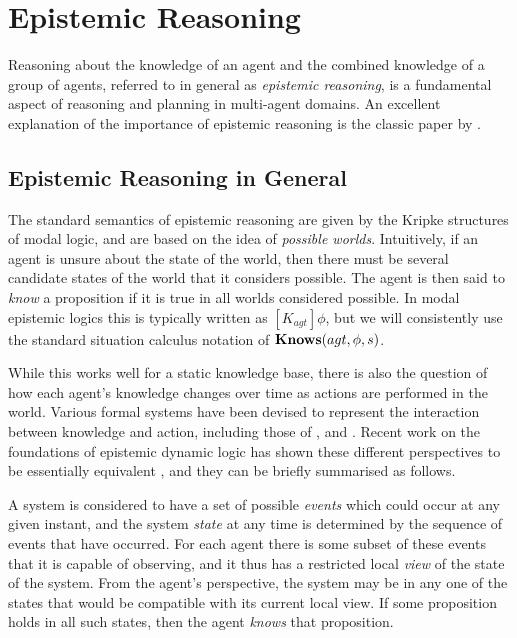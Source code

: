\section{Epistemic Reasoning\label{sec:Background:Epistemic}}

Reasoning about the knowledge of an agent and the combined knowledge
of a group of agents, referred to in general as \emph{epistemic reasoning},
is a fundamental aspect of reasoning and planning in multi-agent domains.
An excellent explanation of the importance of epistemic reasoning
is the classic paper by \citet{halpern90knowledge_distrib}.


\subsection{Epistemic Reasoning in General}

The standard semantics of epistemic reasoning are given by the Kripke
structures of modal logic, and are based on the idea of \emph{possible
worlds}. Intuitively, if an agent is unsure about the state of the
world, then there must be several candidate states of the world that
it considers possible. The agent is then said to \emph{know} a proposition
if it is true in all worlds considered possible. In modal epistemic
logics this is typically written as $[K_{agt}]\phi$, but we will
consistently use the standard situation calculus notation of $\mathbf{Knows}(agt,\phi,s)$.

While this works well for a static knowledge base, there is also the
question of how each agent's knowledge changes over time as actions
are performed in the world. Various formal systems have been devised
to represent the interaction between knowledge and action, including
those of \citet{fagin95}, \citet{parikh85dist_knowledge} and \citet{baltag98pa_ck}.
Recent work on the foundations of epistemic dynamic logic has shown
these different perspectives to be essentially equivalent \citep{vanBentham06tree_of_knowledge,pacuit07history_structures},
and they can be briefly summarised as follows.

A system is considered to have a set of possible \emph{events} which
could occur at any given instant, and the system \emph{state} at any
time is determined by the sequence of events that have occurred. For
each agent there is some subset of these events that it is capable of
observing, and it thus has a restricted local \emph{view} of the state
of the system. From the agent's perspective, the system may be in
any one of the states that would be compatible with its current local
view. If some proposition holds in all such states, then the agent
\emph{knows} that proposition.


